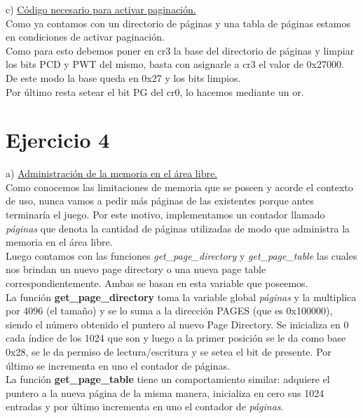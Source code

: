 \documentclass[a4paper]{article}
\begin{document}
{\large c)} \underline{C\'odigo necesario para activar paginaci\'on.}\\

Como ya contamos con un directorio de p\'aginas y una tabla de p\'aginas estamos en condiciones de activar paginaci\'on.\\


Como para esto debemos poner en cr3 la base del directorio de p\'aginas y limpiar los bits PCD y PWT del mismo, basta con asignarle a cr3 el valor de 0x27000. De este modo la base queda en 0x27 y los bits limpios.\\

Por \'ultimo resta setear el bit PG del cr0, lo hacemos mediante un or.

\newpage
\section{Ejercicio 4}
{\large a)} \underline{Administraci\'on de la memoria en el \'area libre.}\\

Como conocemos las limitaciones de memoria que se poseen y acorde el contexto de uso, nunca vamos a pedir m\'as p\'aginas de las existentes porque antes terminar\'ia el juego. Por este motivo, implementamos un contador llamado \textit{p\'aginas} que denota la cantidad de p\'aginas utilizadas de modo que administra la memoria en el \'area libre.\\

Luego contamos con las funciones \textit{get_page_directory} y \textit{get_page_table} las cuales nos brindan un nuevo page directory o una nueva page table correspondientemente. Ambas se basan en esta variable que poseemos. \\

La funci\'on \textbf{get_page_directory} toma la variable global \textit{p\'aginas} y la multiplica por 4096 (el tama\~no) y se lo suma a la direcci\'on PAGES (que es 0x100000), siendo el n\'umero obtenido el puntero al nuevo Page Directory. Se inicializa en 0 cada \'indice de los 1024 que son y luego a la primer posici\'on se le da como base 0x28, se le da permiso de lectura/escritura y se setea el bit de presente. Por \'ultimo se incrementa en uno el contador de p\'aginas.\\

La funci\'on \textbf{get_page_table} tiene un comportamiento similar: adquiere el puntero a la nueva p\'agina de la misma manera, inicializa en cero sus 1024 entradas y por \'ultimo incrementa en uno el contador de \textit{p\'aginas}.\\
\end{document}

